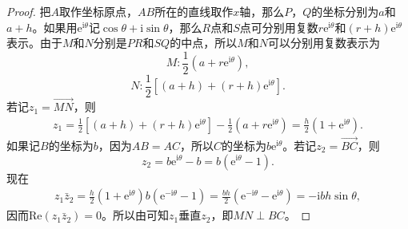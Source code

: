 \documentclass[../../main.tex]{subfiles}%
\begin{document}
\begin{proof}

把\(A\)取作坐标原点，\(AB\)所在的直线取作\(x\)轴，那么\(P\)，\(Q\)的坐标分别为\(a\)和\(a + h\)。如果用\(\mathrm{e}^{\mathrm{i}\theta}\)记\(\cos\theta + \mathrm{i}\sin\theta\)，那么\(R\)点和\(S\)点可分别用复数\(r\mathrm{e}^{\mathrm{i}\theta}\)和\((r + h)\mathrm{e}^{\mathrm{i}\theta}\)表示。由于\(M\)和\(N\)分别是\(PR\)和\(SQ\)的中点，所以\(M\)和\(N\)可以分别用复数表示为
\[
M: \frac{1}{2}(a + r\mathrm{e}^{\mathrm{i}\theta}),
\]
\[
N: \frac{1}{2}[(a + h) + (r + h)\mathrm{e}^{\mathrm{i}\theta}].
\]
若记\(z_1 = \overrightarrow{MN}\)，则
\[
\begin{split}
z_1 = \frac{1}{2}[(a + h) + (r + h)\mathrm{e}^{\mathrm{i}\theta}] - \frac{1}{2}(a + r\mathrm{e}^{\mathrm{i}\theta}) = \frac{h}{2}(1 + \mathrm{e}^{\mathrm{i}\theta}).
\end{split}
\]
如果记\(B\)的坐标为\(b\)，因为\(AB = AC\)，所以\(C\)的坐标为\(b\mathrm{e}^{\mathrm{i}\theta}\)。若记\(z_2 = \overrightarrow{BC}\)，则
\[
z_2 = b\mathrm{e}^{\mathrm{i}\theta} - b = b(\mathrm{e}^{\mathrm{i}\theta} - 1).
\]
现在
\[
\begin{split}
z_1\bar{z}_2 = \frac{h}{2}(1 + \mathrm{e}^{\mathrm{i}\theta})b(\mathrm{e}^{-\mathrm{i}\theta} - 1) = \frac{bh}{2}(\mathrm{e}^{-\mathrm{i}\theta} - \mathrm{e}^{\mathrm{i}\theta}) = -\mathrm{i}bh\sin\theta,
\end{split}
\]
因而\(\mathrm{Re}(z_1\bar{z}_2) = 0\)。所以由可知\(z_1\)垂直\(z_2\)，即\(MN \perp BC\)。 

\end{proof}
\end{document}
